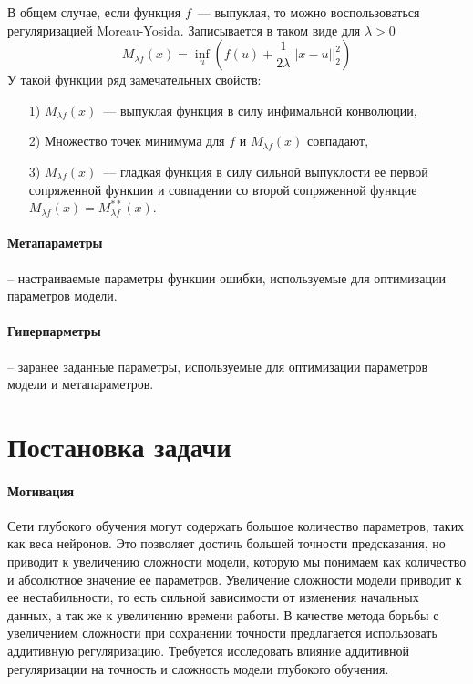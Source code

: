 \documentclass[12pt, twoside]{article}
\begin{document}
В общем случае, если функция $f$~--- выпуклая, то можно воспользоваться регуляризацией Moreau-Yosida. Записывается в таком виде для $\lambda > 0$
\begin{equation}
M_{\lambda f}(x) = \underset{u}\inf(f(u) + \frac{1}{2\lambda}||x - u||_2^2) 
\end{equation}
У такой функции ряд замечательных свойств:
\begin{enumerate}
    \item[1)] $M_{\lambda f}(x)$~--- выпуклая функция в силу инфимальной конволюции,\\
    \item[2)] Множество точек минимума для $f$ и $M_{\lambda f}(x)$ совпадают, \\
    \item[3)] $M_{\lambda f}(x)$~--- гладкая функция в силу сильной выпуклости ее первой сопряженной функции и совпадении со второй сопряженной функцие $M_{\lambda f}(x) = M_{\lambda f}^{**}(x)$. \\
\end{enumerate}
\paragraph{Метапараметры} -- настраиваемые параметры функции ошибки, используемые для оптимизации параметров модели.
\paragraph{Гиперпарметры} -- заранее заданные параметры, используемые для оптимизации параметров модели и метапараметров.


\section{Постановка задачи}
\paragraph{Мотивация}
Сети глубокого обучения могут содержать большое количество параметров, таких как веса нейронов. Это позволяет достичь большей точности предсказания, но приводит к увеличению сложности модели, которую мы понимаем как количество и абсолютное значение ее параметров. Увеличение сложности модели приводит к ее нестабильности, то есть сильной зависимости от изменения начальных данных, а так же к увеличению времени работы. В качестве метода борьбы с увеличением сложности при сохранении точности предлагается использовать аддитивную регуляризацию. Требуется исследовать влияние аддитивной регуляризации на точность и сложность модели глубокого обучения. 
\end{document}
